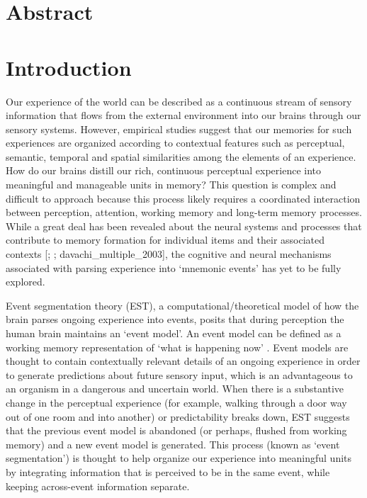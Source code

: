 \section{Abstract}\label{abstract}

\section{Introduction}\label{introduction}

Our experience of the world can be described as a continuous stream of
sensory information that flows from the external environment into our
brains through our sensory systems. However, empirical studies suggest
that our memories for such experiences are organized according to
contextual features such as perceptual, semantic, temporal and spatial
similarities among the elements of an experience. How do our brains
distill our rich, continuous perceptual experience into meaningful and
manageable units in memory? This question is complex and difficult to
approach because this process likely requires a coordinated interaction
between perception, attention, working memory and long-term memory
processes. While a great deal has been revealed about the neural systems
and processes that contribute to memory formation for individual items
and their associated contexts {[}\textcite{davachi_item_2006};
\textcite{ranganath_neural_2003}; davachi\_multiple\_2003{]}, the
cognitive and neural mechanisms associated with parsing experience into
`mnemonic events' has yet to be fully explored.

Event segmentation theory (EST), a computational/theoretical model of
how the brain parses ongoing experience into events, posits that during
perception the human brain maintains an `event model'. An event model
can be defined as a working memory representation of `what is happening
now' \autocite{kurby_segmentation_2008}. Event models are thought to
contain contextually relevant details of an ongoing experience in order
to generate predictions about future sensory input, which is an
advantageous to an organism in a dangerous and uncertain world. When
there is a substantive change in the perceptual experience (for example,
walking through a door way out of one room and into another) or
predictability breaks down, EST suggests that the previous event model
is abandoned (or perhaps, flushed from working memory) and a new event
model is generated. This process (known as `event segmentation') is
thought to help organize our experience into meaningful units by
integrating information that is perceived to be in the same event, while
keeping across-event information separate.

